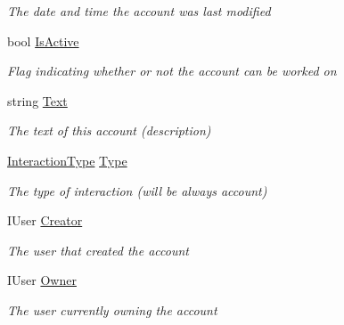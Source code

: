 \begin{DoxyCompactItemize}
\begin{DoxyCompactList}\small\item\em The date and time the account was last modified \end{DoxyCompactList}\item 
bool \hyperlink{class_plex_byte_1_1_mo_cap_1_1_interactions_1_1_account_adce5e94f1e2ca7340805ad6f601ebe5f}{Is\+Active}
\begin{DoxyCompactList}\small\item\em Flag indicating whether or not the account can be worked on \end{DoxyCompactList}\item 
string \hyperlink{class_plex_byte_1_1_mo_cap_1_1_interactions_1_1_account_a271c6c603f997216f42f290de1dc89eb}{Text}
\begin{DoxyCompactList}\small\item\em The text of this account (description) \end{DoxyCompactList}\item 
\hyperlink{namespace_plex_byte_1_1_mo_cap_1_1_interactions_a6e7bea333446664bbce2bb296db25e31}{Interaction\+Type} \hyperlink{class_plex_byte_1_1_mo_cap_1_1_interactions_1_1_account_ab8c590e09224e5015e66019cec50280c}{Type}
\begin{DoxyCompactList}\small\item\em The type of interaction (will be always account) \end{DoxyCompactList}\item 
I\+User \hyperlink{class_plex_byte_1_1_mo_cap_1_1_interactions_1_1_account_ab04766b742ba744b403e1e24f702b0d1}{Creator}
\begin{DoxyCompactList}\small\item\em The user that created the account \end{DoxyCompactList}\item 
I\+User \hyperlink{class_plex_byte_1_1_mo_cap_1_1_interactions_1_1_account_a36d8ba4726f5289eabc6173ad9e910d6}{Owner}
\begin{DoxyCompactList}\small\item\em The user currently owning the account \end{DoxyCompactList}\item 

\end{DoxyCompactItemize}
